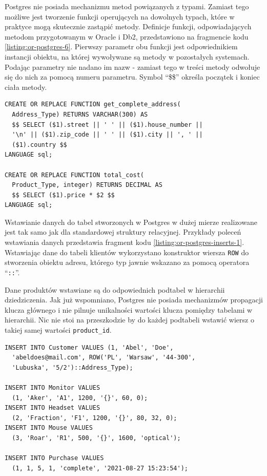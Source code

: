 \documentclass[a4paper,twoside,12pt]{book}
\begin{document}
Postgres nie posiada mechanizmu metod powiązanych z typami. Zamiast tego możliwe jest tworzenie funkcji operujących na dowolnych typach, które w praktyce mogą skutecznie zastąpić metody. Definicje funkcji, odpowiadających metodom przygotowanym w Oracle i Db2, przedstawiono na fragmencie kodu \ref{listing:or-postgres-6}. Pierwszy parametr obu funkcji jest odpowiednikiem instancji obiektu, na której wywoływane są metody w pozostałych systemach. Podając parametry nie nadano im nazw - zamiast tego w treści metody odwołuje się do nich za pomocą numeru parametru. Symbol ``\$\$'' określa początek i koniec ciała metody.

\vspace{0.25cm}

\begin{lstlisting}[style=SQL, caption={Definicje funkcji w Postgres.}, label={listing:or-postgres-6}, captionpos=b]
CREATE OR REPLACE FUNCTION get_complete_address(
  Address_Type) RETURNS VARCHAR(300) AS 
  $$ SELECT ($1).street || ' ' || ($1).house_number || 
  '\n' || ($1).zip_code || ' ' || ($1).city || ', ' || 
  ($1).country $$
LANGUAGE sql;

CREATE OR REPLACE FUNCTION total_cost(
  Product_Type, integer) RETURNS DECIMAL AS 
  $$ SELECT ($1).price * $2 $$
LANGUAGE sql;
\end{lstlisting}

Wstawianie danych do tabel stworzonych w Postgres w dużej mierze realizowane jest tak samo jak dla standardowej struktury relacyjnej. Przykłady poleceń wstawiania danych przedstawia fragment kodu \ref{listing:or-postgres-inserts-1}. Wstawiając dane do tabeli klientów wykorzystano konstruktor wiersza \lstinline{ROW} do stworzenia obiektu adresu, którego typ jawnie wskazano za pomocą operatora ``\lstinline{::}''.

\vspace{0.1cm}

Dane produktów wstawiane są do odpowiednich podtabel w hierarchii dziedziczenia. Jak już wspomniano, Postgres nie posiada mechanizmów propagacji klucza głównego i nie pilnuje unikalności wartości klucza pomiędzy tabelami w hierarchii. Nic nie stoi na przeszkodzie by do każdej podtabeli wstawić wiersz o takiej samej wartości \lstinline{product_id}.

\vspace{0.1cm}

\begin{lstlisting}[style=SQL, caption={Wstawianie danych do bazy Postgres.}, label={listing:or-postgres-inserts-1}, captionpos=b]
INSERT INTO Customer VALUES (1, 'Abel', 'Doe', 
  'abeldoes@mail.com', ROW('PL', 'Warsaw', '44-300', 
  'Lubuska', '5/2')::Address_Type);

INSERT INTO Monitor VALUES 
  (1, 'Aker', 'A1', 1200, '{}', 60, 0);
INSERT INTO Headset VALUES 
  (2, 'Fraction', 'F1', 1200, '{}', 80, 32, 0);
INSERT INTO Mouse VALUES 
  (3, 'Roar', 'R1', 500, '{}', 1600, 'optical');

INSERT INTO Purchase VALUES 
  (1, 1, 5, 1, 'complete', '2021-08-27 15:23:54');
\end{lstlisting}
\end{document}

